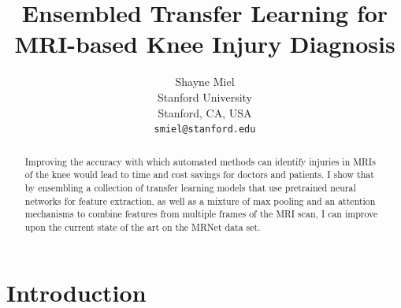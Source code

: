\documentclass[10pt,twocolumn,letterpaper]{article}
\begin{document}
\title{Ensembled Transfer Learning for MRI-based Knee Injury Diagnosis}

\author{Shayne Miel\\
Stanford University\\
Stanford, CA, USA\\
{\tt\small smiel@stanford.edu}
}

\maketitle

\begin{abstract}
   Improving the accuracy with which automated methods can identify injuries in
   MRIs of the knee would lead to time and cost savings for doctors and patients.
   I show that by ensembling a collection of transfer learning models that use pretrained neural networks for feature extraction, as well as a mixture of max pooling and an attention mechanisms to combine features from multiple
   frames of the MRI scan, I can improve upon the current state of the art on
   the MRNet data set.
\end{abstract}

\section{Introduction} %
\end{document}
